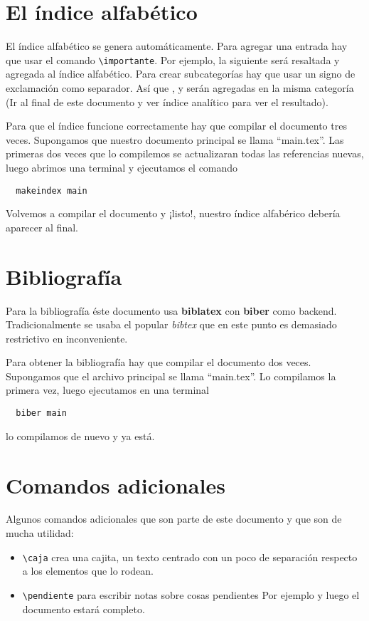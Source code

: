\documentclass[11pt, twoside]{book}
\begin{document}
\section{El índice alfabético}
El índice alfabético se genera automáticamente. Para agregar una entrada hay que
usar el comando \verb|\importante|. Por ejemplo, la siguiente
 será resaltada y agregada al índice alfabético. Para crear
subcategorías hay que usar un signo de exclamación como separador. Así que
,  y
 serán agregadas en la misma categoría (Ir al final
de este documento y ver índice analítico para ver el resultado).

Para que el índice funcione correctamente hay que compilar el documento tres
veces. Supongamos que nuestro documento principal se llama ``main.tex''. Las
primeras dos veces que lo compilemos se actualizaran todas las referencias
nuevas, luego abrimos una terminal y ejecutamos el comando

\begin{verbatim}
  makeindex main
\end{verbatim}

Volvemos a compilar el documento y ¡listo!, nuestro índice alfabérico debería
aparecer al final.

\section{Bibliografía}
Para la bibliografía éste documento usa \textbf{biblatex} con \textbf{biber}
como backend. Tradicionalmente se usaba el popular \textit{bibtex} que en este
punto es demasiado restrictivo en inconveniente. 

Para obtener la bibliografía hay que compilar el documento dos veces.
Supongamos que el archivo principal se llama ``main.tex''. Lo compilamos la
primera vez, luego ejecutamos en una terminal

\begin{verbatim}
  biber main
\end{verbatim}

lo compilamos de nuevo y ya está.

\section{Comandos adicionales}
Algunos comandos adicionales que son parte de este documento y que son de mucha
utilidad:

\begin{itemize}
  \item \verb|\caja| crea una cajita, un texto centrado con un poco de
    separación respecto a los elementos que lo rodean.
  \item \verb|\pendiente| para escribir notas sobre cosas pendientes
    Por ejemplo  y luego el documento
    estará completo.
\end{itemize}
\end{document}
